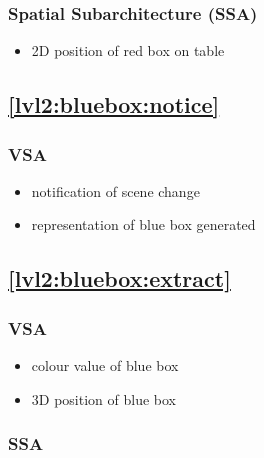 \documentclass{article}
\begin{document}
\subsubsection{Spatial Subarchitecture (SSA)}

\begin{itemize}

\item 2D position of red box on table

\end{itemize}


\subsection{\ref{lvl2:bluebox:notice}}

\subsubsection{VSA}

\begin{itemize}

\item notification of scene change

\item representation of blue box generated

\end{itemize}



\subsection{\ref{lvl2:bluebox:extract}}

\subsubsection{VSA}

\begin{itemize}

\item colour value of blue box

\item 3D position of blue box

\end{itemize}

\subsubsection{SSA}
\end{document}

